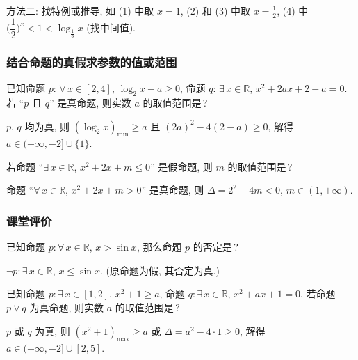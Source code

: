     方法二: 找特例或推导, 如 (1) 中取 $x=1$, (2) 和 (3) 中取 $x=\frac12$, (4) 中  $\Big(\dfrac12\Big)^x<1< \log_{\frac13} x$ (找中间值).
  \endsolution
  
  \subsubsection{结合命题的真假求参数的值或范围}
  \begin{example}
    已知命题 $p$: $\forall\,x\in [2,4]$, $\log_2 x-a\geqslant 0$, 
    命题 $q$: $\exists\,x\in \mathbb{R}$, $x^2 +2ax+2-a=0$. 
    若 ``$p$ 且 $q$'' 是真命题, 则实数 $a$ 的取值范围是\,?
  \end{example}

  \beginsolution
    $p$, $q$ 均为真, 则 $(\log_2 x)_{\min} \geqslant a$ 且 $(2a)^2-4(2-a)\geqslant 0$, 解得 $a\in(-\infty,-2]\cup\{1\}$.
  \endsolution
  
  \lianxi
  \begin{exercise}[s]
    若命题 ``$\exists\,x\in \mathbb{R}$, $x^2 +2x+m\leqslant 0$'' 是假命题, 
    则 $m$ 的取值范围是\,?
  \end{exercise}

  \beginsolution
    命题 ``$\forall\,x\in \mathbb{R}$, $x^2 +2x+m> 0$'' 是真命题, 则 $\Delta=2^2-4m<0$, $m\in(1,+\infty)$.
  \endsolution
  
  \subsubsection{课堂评价}
  \begin{exercise}
    已知命题 $p\colon \forall\, x\in \mathbb{R}$, $x>\sin x$, 
    那么命题 $p$ 的否定是\,?
  \end{exercise}

  \beginsolution
    $\neg p\colon \exists\, x\in \mathbb{R}$, $x\leqslant\sin x$. (原命题为假, 其否定为真.)
  \endsolution
  
  \begin{exercise}
    已知命题 $p\colon \exists\, x\in [1,2]$, $x^2 +1\geqslant a$, 
    命题 $q\colon \exists\, x\in \mathbb{R}$, $x^2 +ax+1=0$. 
    若命题 $p\vee q$ 为真命题, 则实数 $a$ 的取值范围是\,?
  \end{exercise}

  \beginsolution
    $p$ 或 $q$ 为真, 则 $(x^2+1)_{\max}\geqslant a$ 或 $\Delta= a^2-4\cdot 1\geqslant 0$, 解得 $a\in(-\infty,-2]\cup [2,5]$.
  \endsolution
  
